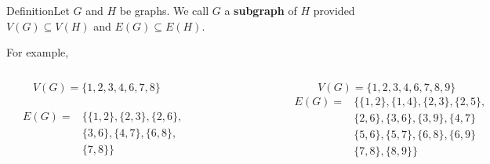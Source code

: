 \documentclass{beamer}
\def\bl[#1]#2{\begin{block}{#1}#2\end{block}}
\begin{document}
\begin{frame}
\bl[Definition]{Let $G$ and $H$ be graphs. We call $G$ a \textbf{subgraph} of $H$ provided $V(G)\subseteq V(H)$ and $E(G)\subseteq E(H)$.}
For example,\vspace{-0.3cm}
\begin{columns}
\vspace{0.1cm}
\[
V(G)=\{1,2,3,4,6,7,8\}
\]\vspace{-1.5cm}\\
\begin{align*}
~~~~~E(G)=&\big\{\{1,2\},\{2,3\},\{2,6\},\\
&\{3,6\},\{4,7\},\{6,8\},\\
&\{7,8\}\big\}
\end{align*}\vspace{-0.5cm}
\begin{figure}
\centering
\includegraphics[scale=0.3]{subgraphexample1.pdf}
\end{figure}
\[
V(G)=\{1,2,3,4,6,7,8,9\}
\]\vspace{-1cm}
\begin{align*}
~~~E(G)=&\big\{\{1,2\},\{1,4\},\{2,3\},\{2,5\},\\
&\{2,6\},\{3,6\},\{3,9\},\{4,7\}\\
&\{5,6\},\{5,7\},\{6,8\},\{6,9\}\\
&\{7,8\},\{8,9\}\big\}
\end{align*}\vspace{-1cm}
\begin{figure}
\centering

\end{figure}
\end{columns}
\end{frame}
\end{document}
